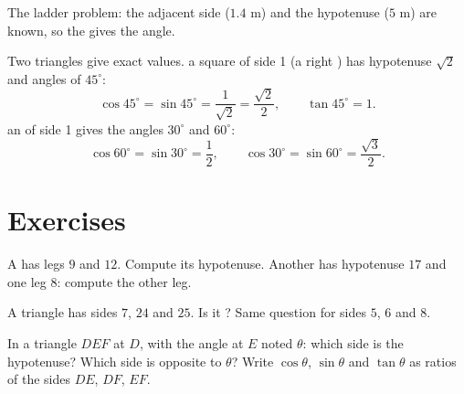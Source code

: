 \begin{omfigure}

{\small The ladder problem: the adjacent side ($1.4$ m) and the
hypotenuse ($5$ m) are known, so the  gives the angle.}
\end{omfigure}

\begin{example}\label{ex:g9:trig:special}
Two triangles give exact values.  a square of side 1 (a right
) has hypotenuse $\sqrt2$ and angles of $45^\circ$:
\[
\cos 45^\circ = \sin 45^\circ = \frac{1}{\sqrt2} = \frac{\sqrt2}{2},
\qquad \tan 45^\circ = 1 .
\]
 an  of side 1 gives the angles $30^\circ$ and
$60^\circ$:
\[
\cos 60^\circ = \sin 30^\circ = \frac12,
\qquad
\cos 30^\circ = \sin 60^\circ = \frac{\sqrt3}{2}.
\]
\end{example}

\section{Exercises}

\begin{exercise}[$\star$]\label{exo:g9:trig:1}
A  has legs $9$ and $12$. Compute its hypotenuse. Another
has hypotenuse $17$ and one leg $8$: compute the other leg.
\end{exercise}

\begin{exercise}[$\star$]\label{exo:g9:trig:2}
A triangle has sides $7$, $24$ and $25$. Is it ? Same
question for sides $5$, $6$ and $8$.
\end{exercise}

\begin{exercise}[$\star$]\label{exo:g9:trig:3}
In a triangle $DEF$  at $D$, with the angle at $E$ noted
$\theta$: which side is the hypotenuse? Which side is opposite to
$\theta$? Write $\cos\theta$, $\sin\theta$ and $\tan\theta$ as ratios of
the sides $DE$, $DF$, $EF$.
\end{exercise}


